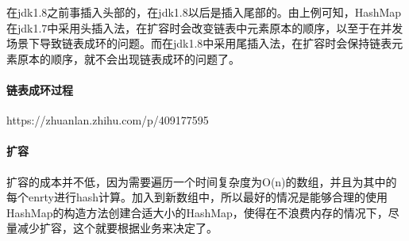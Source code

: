 \documentclass[../../../interview-questions.tex]{subfiles}
\begin{document}
在jdk1.8之前事插入头部的，在jdk1.8以后是插入尾部的。由上例可知，HashMap在jdk1.7中采用头插入法，在扩容时会改变链表中元素原本的顺序，以至于在并发场景下导致链表成环的问题。而在jdk1.8中采用尾插入法，在扩容时会保持链表元素原本的顺序，就不会出现链表成环的问题了。

\paragraph{链表成环过程}

https://zhuanlan.zhihu.com/p/409177595

\paragraph{扩容}

扩容的成本并不低，因为需要遍历一个时间复杂度为O(n)的数组，并且为其中的每个enrty进行hash计算。加入到新数组中，所以最好的情况是能够合理的使用HashMap的构造方法创建合适大小的HashMap，使得在不浪费内存的情况下，尽量减少扩容，这个就要根据业务来决定了。
\end{document}
